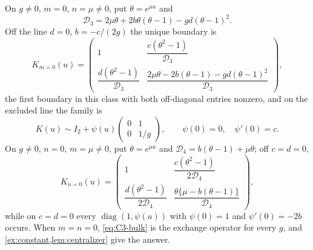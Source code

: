\documentclass[11pt,reqno]{amsart}
\theoremstyle{plain}
\theoremstyle{definition}
\theoremstyle{remark}
\numberwithin{equation}{section}
\providecommand{\diag}{\operatorname{diag}}
\newcommand{\Id}{I_2}
\begin{document}
On $g\ne0$, $m=0$, $n=\mu\ne0$, put $\theta=e^{\mu u}$ and
\begin{equation}
\mathcal D_3=2\mu\theta+2b\theta(\theta-1)-gd(\theta-1)^2 .
\label{eq:C3-D3}
\end{equation}
Off the line $d=0$, $b=-c/(2g)$ the unique boundary is
\begin{equation}
K_{m=0}(u)=\begin{pmatrix}
1&\dfrac{c(\theta^2-1)}{\mathcal D_3}\\[1mm]
\dfrac{d(\theta^2-1)}{\mathcal D_3}&
\dfrac{2\mu\theta-2b(\theta-1)-gd(\theta-1)^2}{\mathcal D_3}
\end{pmatrix},                                      \label{eq:C3-mzero}
\end{equation}
the first boundary in this class with both off-diagonal entries nonzero, and on
the excluded line the family is
\begin{equation}
K(u)\sim \Id+\psi(u)\begin{pmatrix}0&1\\0&1/g\end{pmatrix},
\qquad \psi(0)=0,\quad \psi'(0)=c.                        \label{eq:C3-mzero-fun}
\end{equation}
On $g\ne0$, $n=0$, $m=\mu\ne0$, put $\theta=e^{\mu u}$ and
$\mathcal D_4=b(\theta-1)+\mu\theta$; off $c=d=0$,
\begin{equation}
K_{n=0}(u)=\begin{pmatrix}
1&\dfrac{c(\theta^2-1)}{2\mathcal D_4}\\[1mm]
\dfrac{d(\theta^2-1)}{2\mathcal D_4}&
\dfrac{\theta\{\mu-b(\theta-1)\}}{\mathcal D_4}
\end{pmatrix},                                     \label{eq:C3-nzero}
\end{equation}
while on $c=d=0$ every $\diag(1,\psi(u))$ with $\psi(0)=1$ and $\psi'(0)=-2b$
occurs. When $m=n=0$, \cref{eq:C3-bulk} is the exchange operator for every $g$,
and \cref{ex:constant,lem:centralizer} give the answer.
\end{document}
